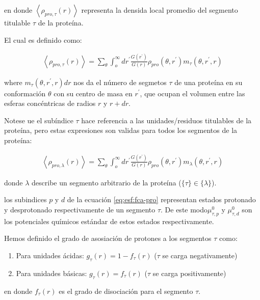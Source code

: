 \noindent en donde $\left<\rho_{pro,\tau}(r)\right>$ representa la densida local promedio del segmento titulable $\tau$ de la prote\'ina.

El cual es definido como:


\begin{align}
	\left<\rho_{pro,\tau}(r)\right> = \sum_\theta \int_o^\infty dr^\prime \frac{G(r^\prime)}{G(r)} \rho_{pro}(\theta,r^\prime)m_\tau(\theta,r^\prime,r)
	\label{eq:esf:segments-pro-vector}
\end{align}


\noindent where $m_\tau(\theta,r^\prime,r) dr$  nos da el n\'umero de segmetos $\tau$  de una prote\'ina en su conformaci\'on $\theta$ con su centro de masa en $r^\prime$, que ocupan el volumen entre las esferas conc\'entricas de radios $r$ y $r + dr$.



Notese ue el sub\'indice  $\tau$ hace referencia a las unidades/residuos titulables de la prote\'ina, pero estas expresiones son validas para todos los segmentos de la prote\'ina:

\begin{align}
	\left<\rho_{pro,\lambda}(r)\right> = \sum_\theta \int_o^\infty dr^\prime \frac{G(r^\prime)}{G(r)} \rho_{pro}(\theta,r^\prime)m_\lambda(\theta,r^\prime,r)
	\label{eq:esf:segments-pro}
\end{align}



\noindent donde $\lambda$  describe un segmento arbitrario de la prote\'ina ($\{\tau\}\in\{\lambda\}$).

los subindices $p$ y $d$  de la ecuaci\'on \ref{eq:esf:fca-pro} representan estados protonado y desprotonado respectivamente de un segmento $\tau$. 
De este modo$\mu^0_{\tau,p}$ y $\mu^0_{\tau,d}$  son los potenciales qu\'imicos est\'andar de estos estados respectivamente.

Hemos definido el grado de asosiaci\'on de protones a los segmentos $\tau$
como: 
 
\begin{enumerate}
	\item Para unidades \'acidas: $g_\tau(r) = 1-f_\tau(r)$ ($\tau$ se carga negativamente)
	\item Para unidades b\'asicas: $g_\tau(r) = f_\tau(r)$ ($\tau$ se carga positivamente)
\end{enumerate}
\noindent en donde $f_\tau(r)$  es el grado de disociaci\'on  para el segmento $\tau$.


